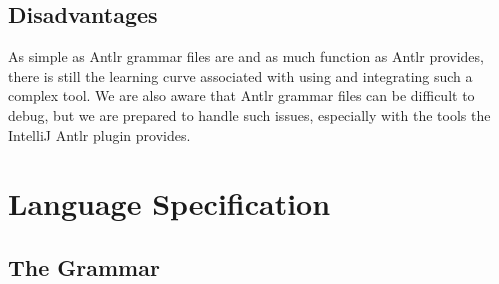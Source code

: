 \documentclass{article}
\begin{document}
\subsection{Disadvantages}
As simple as Antlr grammar files are and as much function as Antlr provides, there is still the learning curve associated with using and integrating such a complex tool. We are also aware that Antlr grammar files can be difficult to debug, but we are prepared to handle such issues, especially with the tools the IntelliJ Antlr plugin provides.


\section{Language Specification}
\subsection{The Grammar}
\end{document}
